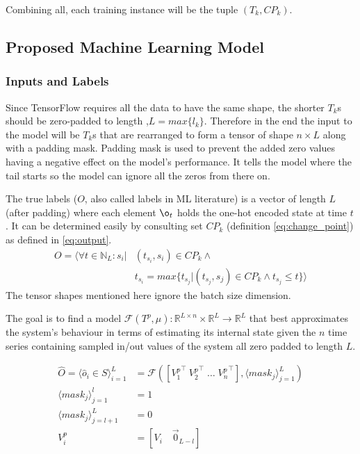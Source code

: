 Combining all, each training instance will be the tuple $(T_k, CP_k)$.

\subsection{Proposed Machine Learning Model}
\subsubsection{Inputs and Labels} \label{data_set_properties}


Since TensorFlow requires all the data to have the same shape, the shorter $T_k$s should be zero-padded to length ,$L = max\{l_k\}$.
Therefore in the end the input to the model will be $T_k$s that are rearranged to form a tensor of shape $n \times L$ along with a padding mask. Padding mask is used to prevent the added zero values having a negative effect on the model's performance. It tells the model where the tail starts so the model can ignore all the zeros from there on.

The true labels ($O$, also called labels in ML literature) is a vector of length $L$ (after padding) where each element $\o_t$ holds the one-hot encoded state at time $t$. It can be determined easily by consulting set $CP_k$ (definition \eqref{eq:change_point}) as defined in \eqref{eq:output}.
\begin{equation} \label{eq:output}
\begin{split}
O = \langle  \forall t \in \mathbb{N}_L : s_i | 
            &{} (t_{s_i}, s_i) \in CP_k \land  \\
            & t_{s_i} = max\{t_{s_j} | (t_{s_j}, s_j) \in CP_k \land t_{s_j}\leq t\} \rangle
\end{split}
\end{equation}
The tensor shapes mentioned here ignore the batch size dimension.

The goal is to find a model $\mathcal{F}(T^p, \mu) \colon \mathbb{R}^{L\times n}\times\mathbb{R}^L\to\mathbb{R}^{L}$ that best approximates the system's behaviour in terms of estimating its internal state given the $n$ time series containing sampled in/out values of the system all zero padded to length $L$.

\begin{equation}\label{eq:model_as_function}
\begin{split}
    \hat{O} = \langle \hat{o}_i \in S \rangle^L_{i=1} {}&{}= \mathcal{F}\left(\left[ {V^p_1}^\intercal \: {V^p_2}^\intercal \; \ldots \; {V^p_n}^\intercal \right], \langle {mask}_j \rangle^L_{j=1}\right) \\
    \langle {mask}_j \rangle^l_{j=1} {}&{}= 1  \\
    \langle {mask}_j \rangle^L_{j=l+1} {}&{}= 0 \\
    V^p_i {}&{}= \left[V_i \quad \vec{0}_{L-l}\right]
\end{split}
\end{equation}

